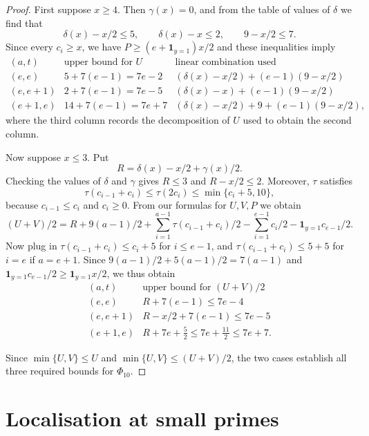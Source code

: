 \documentclass[a4paper,11pt, twoside,reqno]{amsart}
\theoremstyle{plain}
\theoremstyle{definition}
\theoremstyle{remark}
\renewcommand{\le}{\leqslant}
\renewcommand{\ge}{\geqslant}
\numberwithin{equation}{section}
\begin{document}
\begin{proof}
First suppose $x\ge4$. Then $\gamma(x)=0$, and
from the table of values of $\delta$ we find that
\[
\delta(x)-x/2\le5,\qquad
\delta(x)-x\le2,\qquad
9-x/2\le7.
\]
Since every $c_i\ge x$, we have $P \ge (e+\bm{1}_{y=1})x/2$
and these inequalities imply
\[
\begin{array}{c|c|c}
(a,t)&\text{upper bound for }U&\text{linear combination used}\\ \hline
(e,e)&5+7(e-1)=7e-2&(\delta(x)-x/2) + (e-1)(9-x/2)\\
(e,e+1)&2+7(e-1)=7e-5&(\delta(x)-x) + (e-1)(9-x/2)\\
(e+1,e)&14+7(e-1)=7e+7&(\delta(x)-x/2) + 9 + (e-1)(9-x/2),
\end{array}
\]
where the third column records the decomposition of $U$
used to obtain the second column.

Now suppose $x\le3$. Put
\[
R=\delta(x)-x/2+\gamma(x)/2.
\]
Checking the values of $\delta$ and $\gamma$ gives
$R\le3$ and $R-x/2\le2$.
Moreover, $\tau$ satisfies
\[
\tau(c_{i-1}+c_i)\le \tau(2c_i) \le \min\{c_i+5, 10\},
\]
because $c_{i-1}\le c_i$ and $c_i\ge 0$.
From our formulas for $U,V,P$ we obtain
\begin{equation*}
(U+V)/2
= R + 9(a-1)/2 + \sum_{i=1}^{a-1} \tau(c_{i-1}+c_i)/2
- \sum_{i=1}^{e-1} c_i/2 - \bm{1}_{y=1} c_{e-1}/2.
\end{equation*}
Now plug in $\tau(c_{i-1}+c_i)\le c_i+5$ for $i\le e-1$,
and $\tau(c_{i-1}+c_i)\le 5+5$ for $i=e$ if $a=e+1$.
Since $9(a-1)/2 + 5(a-1)/2 = 7(a-1)$
and $\bm{1}_{y=1} c_{e-1}/2 \ge \bm{1}_{y=1} x/2$,
we thus obtain
\[
\begin{array}{c|c}
(a,t)&\text{upper bound for }(U+V)/2\\ \hline
(e,e)&R+7(e-1)\le7e-4\\
(e,e+1)&R-x/2+7(e-1)\le7e-5\\
(e+1,e)&R+7e+\frac52\le7e+\frac{11}2 \le 7e+7.
\end{array}
\]

Since $\min\{U,V\}\le U$ and
$\min\{U,V\}\le(U+V)/2$, the two cases establish
all three required bounds for $\Phi_{10}$.
\end{proof}


\section{Localisation at small primes}
\label{sec:fixed-primes}
\end{document}
